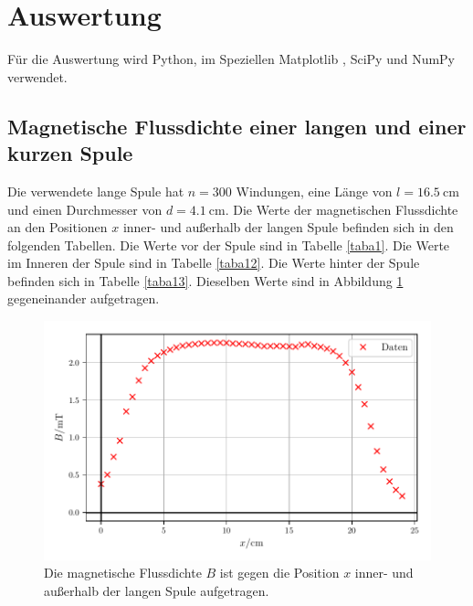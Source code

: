 \section{Auswertung}
\label{sec:Auswertung}

Für die Auswertung wird Python, im Speziellen Matplotlib \cite{matplotlib}, 
SciPy \cite{scipy} und NumPy \cite{numpy} verwendet.

\subsection{Magnetische Flussdichte einer langen und einer kurzen Spule}
Die verwendete lange Spule hat $n = \num{300}$ Windungen, eine Länge%
von $l = \SI{16.5}{\centi\meter}$ und einen Durchmesser von
$d = \SI{4.1}{\centi\meter}$.
Die Werte der magnetischen Flussdichte an den Positionen $x$ inner- und außerhalb
der langen Spule befinden sich in den folgenden Tabellen.
Die Werte vor der Spule sind in Tabelle \ref{taba1}. Die Werte im Inneren
der Spule sind in Tabelle \ref{taba12}. Die Werte hinter der Spule befinden
sich in Tabelle \ref{taba13}. %
Dieselben Werte sind in Abbildung \ref{plota1} gegeneinander aufgetragen.




\begin{figure}
    \centering
    \includegraphics{build/plota1.pdf}
    \caption{Die magnetische Flussdichte $B$ ist gegen die Position $x$ inner- 
    und außerhalb der langen Spule aufgetragen.}
    \label{plota1}
\end{figure}

